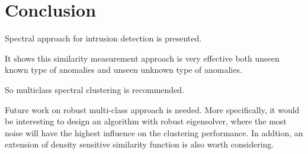 \section{Conclusion}
Spectral approach for intrusion detection is presented. 

It shows this similarity measurement approach is very effective both unseen known type of anomalies and unseen unknown type of anomalies. 

So multiclass spectral clustering is recommended. 

Future work on robust multi-class approach is needed. 
More specifically, it would be interesting to design an algorithm with robust eigensolver, where the most noise will have the highest influence on the clustering performance. 
In addtion, an extension of density sensitive similarity function is also worth considering. 
